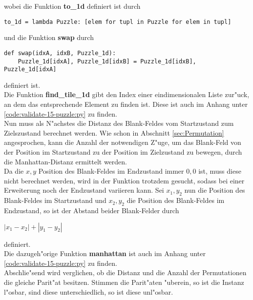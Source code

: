 wobei die Funktion \textbf{to\_1d} definiert ist durch
\vspace{.25cm}
\begin{verbatim}
to_1d = lambda Puzzle: [elem for tupl in Puzzle for elem in tupl]
\end{verbatim}
\vspace{.25cm}
und die Funktion \textbf{swap} durch
\vspace{.25cm}
\begin{verbatim}
def swap(idxA, idxB, Puzzle_1d):
    Puzzle_1d[idxA], Puzzle_1d[idxB] = Puzzle_1d[idxB], Puzzle_1d[idxA]
\end{verbatim}
\vspace{.25cm}
definiert ist.\\
Die Funktion \textbf{find\_tile\_1d} gibt den Index einer eindimensionalen Liste zur"uck, an dem das entsprechende Element zu finden ist. Diese ist auch im Anhang unter \ref{code:validate-15-puzzle:py} zu finden.\\
Nun muss als N"achstes die Distanz des Blank-Feldes vom Startzustand zum Zielszustand berechnet werden. Wie schon in Abschnitt \ref{sec:Permutation} angesprochen, kann die Anzahl der notwendigen Z"uge, um das Blank-Feld von der Position im Startzustand zu der Position im Zielzustand zu bewegen, durch die Manhattan-Distanz ermittelt werden.\\ Da die $x,y$ Position des Blank-Feldes im Endzustand immer $0,0$ ist, muss diese nicht berechnet werden, wird in der Funktion trotzdem gesucht, sodass bei einer Erweiterung noch der Endzustand variieren kann.
Sei $x_1,y_2$ nun die Position des Blank-Feldes im Startzustand und $x_2,y_2$ die Position des Blank-Feldes im Endzustand, so ist der Abstand beider Blank-Felder durch \\
\begin{center}
    $\left | x_1 - x_2 \right | + \left | y_1 - y_2 \right |$
\end{center}
definiert.\\
Die dazugeh"orige Funktion \textbf{manhattan} ist auch im Anhang unter \ref{code:validate-15-puzzle:py} zu finden.\\
Abschlie"send wird verglichen, ob die Distanz und die Anzahl der Permutationen die gleiche Parit"at besitzen. Stimmen die Parit"aten "uberein, so ist die Instanz l"osbar, sind diese unterschiedlich, so ist diese unl"osbar.

